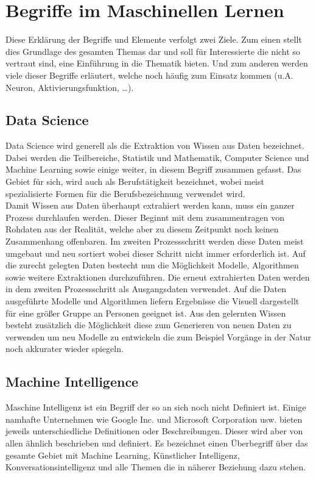 \chapter{Begriffe im Maschinellen Lernen}
\label{cha:Begriffe}

Diese Erklärung der Begriffe und Elemente verfolgt zwei Ziele.
Zum einen stellt dies Grundlage des gesamten Themas dar und soll für Interessierte die nicht so vertraut sind, eine Einführung in die Thematik bieten. Und zum anderen werden viele dieser Begriffe erläutert, welche noch häufig zum Einsatz kommen (u.A. Neuron, Aktivierungsfunktion, …).

\section{Data Science}

Data Science wird generell als die Extraktion von Wissen aus Daten bezeichnet. Dabei werden die Teilbereiche, Statistik und Mathematik, Computer Science und Machine Learning sowie einige weiter, in diesem Begriff zusammen gefasst. Das Gebiet für sich, wird auch als Berufstätigkeit bezeichnet, wobei meist spezialisierte Formen für die Berufsbezeichnung verwendet wird.\\

Damit Wissen aus Daten überhaupt extrahiert werden kann, muss ein ganzer Prozess durchlaufen werden. Dieser Beginnt mit dem zusammentragen von Rohdaten aus der Realität, welche aber zu diesem Zeitpunkt noch keinen Zusammenhang offenbaren. Im zweiten Prozessschritt werden diese Daten meist umgebaut und neu sortiert wobei dieser Schritt nicht immer erforderlich ist. Auf die  zurecht gelegten Daten bestecht nun die Möglichkeit Modelle, Algorithmen sowie weitere Extraktionen durchzuführen. Die erneut extrahierten Daten werden in dem zweiten Prozessschritt als Ausgangsdaten verwendet. Auf die Daten ausgeführte Modelle und Algorithmen liefern Ergebnisse die Visuell dargestellt für eine größer Gruppe an Personen geeignet ist. Aus den gelernten Wissen besteht zusätzlich die Möglichkeit diese zum Generieren von neuen Daten zu verwenden um neu Modelle zu entwickeln die zum Beispiel Vorgänge in der Natur noch akkurater wieder spiegeln.

\section{Machine Intelligence}

Maschine Intelligenz ist ein Begriff der so an sich noch nicht Definiert ist. Einige namhafte Unternehmen wie Google Inc. und Microsoft Corporation usw. bieten jeweils unterschiedliche Definitionen oder Beschreibungen. Dieser wird aber von allen ähnlich beschrieben und definiert. Es bezeichnet einen Überbegriff über das gesamte Gebiet mit Machine Learning, Künstlicher Intelligenz, Konversationsintelligenz und alle Themen die in näherer Beziehung dazu stehen. 

